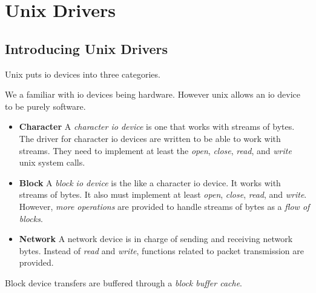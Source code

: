 
\chapter{Unix Drivers}


\section{Introducing Unix Drivers}

Unix puts io devices into three categories.


\begin{figure}[h]
\end{figure}

We a familiar with io devices being hardware.
However unix allows an io device to be purely software. 


\begin{itemize}   
\renewcommand{\labelitemi}{$\Box$}
\item \textbf{Character} 
A \textit{character io device} is one that works with streams of bytes. The driver 
for character io devices are written to be able to work with streams.
They need to implement at least the \textit{open}, \textit{close}, \textit{read}, and 
\textit{write} unix system calls. 
\item \textbf{Block} 
A \textit{block io device} is the like a character io device. 
It works with streams of bytes. It also must implement at least \textit{open}, \textit{close}, \textit{read}, and \textit{write}. However, \textit{more operations} are provided to
handle streams of bytes as a \textit{flow of blocks}. 
\item \textbf{Network} 
A network device is in charge of sending and receiving network bytes.
Instead of \textit{read} and \textit{write}, functions
related to packet transmission are provided.
\end{itemize}


Block device transfers are buffered through a \textit{block buffer cache}.

